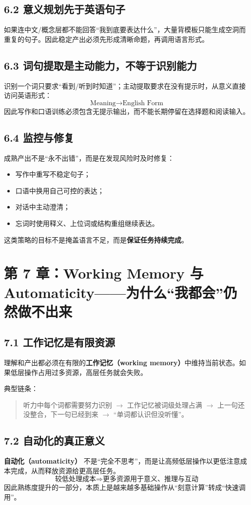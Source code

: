 \documentclass[11pt,a4paper]{ctexart}
\newcommand{\kw}[1]{\textbf{#1}}
\newcommand{\term}[2]{\textbf{#1（#2）}}
\begin{document}
\subsection{6.2 意义规划先于英语句子}
如果连中文/概念层都不能回答“我到底要表达什么”，大量背模板只能生成空洞而重复的句子。因此稳定产出必须先形成清晰命题，再调用语言形式。

\subsection{6.3 词句提取是主动能力，不等于识别能力}
识别一个词只要求“看到/听到时知道”；主动提取要求在没有提示时，从意义直接访问英语形式：
\[
\boxed{\text{Meaning}\rightarrow\text{English Form}}
\]
因此写作和口语训练必须包含无提示输出，而不能长期停留在选择题和阅读输入。

\subsection{6.4 监控与修复}
成熟产出不是“永不出错”，而是在发现风险时及时修复：
\begin{itemize}
  \item 写作中重写不稳定句子；
  \item 口语中换用自己可控的表达；
  \item 对话中主动澄清；
  \item 忘词时使用释义、上位词或结构重组继续表达。
\end{itemize}
这类策略的目标不是掩盖语言不足，而是\kw{保证任务持续完成}。

\newpage
\section{第 7 章：Working Memory 与 Automaticity——为什么“我都会”仍然做不出来}

\subsection{7.1 工作记忆是有限资源}
理解和产出都必须在有限的\term{工作记忆}{working memory}中维持当前状态。如果低层操作占用过多资源，高层任务就会失败。

典型链条：
\begin{quote}
听力中每个词都需要努力识别 $\rightarrow$ 工作记忆被词级处理占满 $\rightarrow$ 上一句还没整合，下一句已经到来 $\rightarrow$ “单词都认识但没听懂”。
\end{quote}

\subsection{7.2 自动化的真正意义}
\term{自动化}{automaticity} 不是“完全不思考”，而是让高频低层操作以更低注意成本完成，从而释放资源给更高层任务。
\[
\boxed{
\text{较低处理成本}
\Rightarrow
\text{更多资源用于意义、推理与互动}
}
\]
因此熟练度提升的一部分，本质上是越来越多基础操作从“刻意计算”转成“快速调用”。
\end{document}
